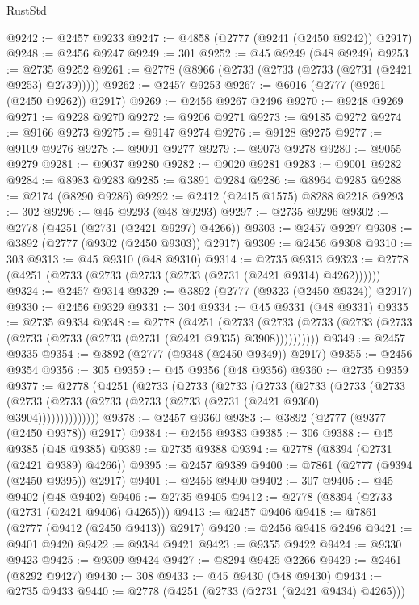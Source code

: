 \begin{lexlean}{RustStd}
\begin{coremodule}
@9242 := @2457 @9233
@9247 := @4858 (@2777 (@9241 (@2450 @9242)) @2917)
@9248 := @2456 @9247
@9249 := 301
@9252 := @45 @9249 (@48 @9249)
@9253 := @2735 @9252
@9261 := @2778 (@8966 (@2733 (@2733 (@2733 (@2731 (@2421 @9253) @2739)))))
@9262 := @2457 @9253
@9267 := @6016 (@2777 (@9261 (@2450 @9262)) @2917)
@9269 := @2456 @9267 @2496
@9270 := @9248 @9269
@9271 := @9228 @9270
@9272 := @9206 @9271
@9273 := @9185 @9272
@9274 := @9166 @9273
@9275 := @9147 @9274
@9276 := @9128 @9275
@9277 := @9109 @9276
@9278 := @9091 @9277
@9279 := @9073 @9278
@9280 := @9055 @9279
@9281 := @9037 @9280
@9282 := @9020 @9281
@9283 := @9001 @9282
@9284 := @8983 @9283
@9285 := @3891 @9284
@9286 := @8964 @9285
@9288 := @2174 (@8290 @9286)
@9292 := @2412 (@2415 @1575) @8288 @2218
@9293 := 302
@9296 := @45 @9293 (@48 @9293)
@9297 := @2735 @9296
@9302 := @2778 (@4251 (@2731 (@2421 @9297) @4266))
@9303 := @2457 @9297
@9308 := @3892 (@2777 (@9302 (@2450 @9303)) @2917)
@9309 := @2456 @9308
@9310 := 303
@9313 := @45 @9310 (@48 @9310)
@9314 := @2735 @9313
@9323 := @2778 (@4251 (@2733 (@2733 (@2733 (@2733 (@2731 (@2421 @9314) @4262))))))
@9324 := @2457 @9314
@9329 := @3892 (@2777 (@9323 (@2450 @9324)) @2917)
@9330 := @2456 @9329
@9331 := 304
@9334 := @45 @9331 (@48 @9331)
@9335 := @2735 @9334
@9348 := @2778
    (@4251
      (@2733 (@2733 (@2733 (@2733 (@2733 (@2733 (@2733 (@2733 (@2731 (@2421 @9335) @3908))))))))))
@9349 := @2457 @9335
@9354 := @3892 (@2777 (@9348 (@2450 @9349)) @2917)
@9355 := @2456 @9354
@9356 := 305
@9359 := @45 @9356 (@48 @9356)
@9360 := @2735 @9359
@9377 := @2778
    (@4251
      (@2733
        (@2733
          (@2733
            (@2733
              (@2733
                (@2733
                  (@2733 (@2733 (@2733 (@2733 (@2733 (@2733 (@2731 (@2421 @9360) @3904))))))))))))))
@9378 := @2457 @9360
@9383 := @3892 (@2777 (@9377 (@2450 @9378)) @2917)
@9384 := @2456 @9383
@9385 := 306
@9388 := @45 @9385 (@48 @9385)
@9389 := @2735 @9388
@9394 := @2778 (@8394 (@2731 (@2421 @9389) @4266))
@9395 := @2457 @9389
@9400 := @7861 (@2777 (@9394 (@2450 @9395)) @2917)
@9401 := @2456 @9400
@9402 := 307
@9405 := @45 @9402 (@48 @9402)
@9406 := @2735 @9405
@9412 := @2778 (@8394 (@2733 (@2731 (@2421 @9406) @4265)))
@9413 := @2457 @9406
@9418 := @7861 (@2777 (@9412 (@2450 @9413)) @2917)
@9420 := @2456 @9418 @2496
@9421 := @9401 @9420
@9422 := @9384 @9421
@9423 := @9355 @9422
@9424 := @9330 @9423
@9425 := @9309 @9424
@9427 := @8294 @9425 @2266
@9429 := @2461 (@8292 @9427)
@9430 := 308
@9433 := @45 @9430 (@48 @9430)
@9434 := @2735 @9433
@9440 := @2778 (@4251 (@2733 (@2731 (@2421 @9434) @4265)))

\end{coremodule}
\end{lexlean}
